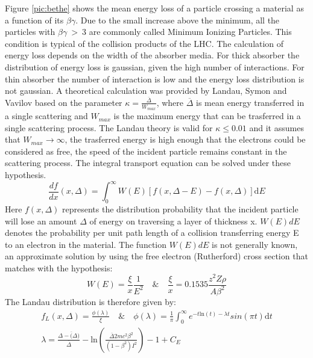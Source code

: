 Figure \ref{pic:bethe} shows the mean energy loss of a particle crossing a material as a function of its $\beta \gamma$.
Due to the small increase above the minimum, all the particles with $\beta \gamma~>~3$ are commonly called Minimum Ionizing Particles. This condition is typical of the collision products of the LHC.
The calculation of energy loss depends on the width of the absorber media. For thick absorber the distribution of energy loss is gaussian, given the high number of interactions. For thin absorber the number of interaction is low and the energy loss distribution is not gaussian. A theoretical calculation was provided by Landau\cite{landau}, Symon and Vavilov based on the parameter $\kappa = \frac{\overline{\Delta}}{W_{max}}$, where $\overline{\Delta}$ is mean energy transferred in a single scattering and $W_{max}$ is the maximum energy that can be trasferred in a single scattering process.
The Landau theory is valid for $\kappa \le 0.01$ and it assumes that $W_{max}\rightarrow \infty$, the trasferred energy is high enough that the electrons could be considered as free, the speed of the incident particle remains constant in the scattering process. The integral transport equation can be solved under these hypothesis.
\begin{equation}
\frac{df}{dx}(x,\Delta) = \int_0^{\infty}W(E)[f(x,\Delta - E)-f(x,\Delta)]\mathrm{d}E
\end{equation}
Here $f(x,\Delta)$ represents the distribution probability that the incident particle will lose an amount $\Delta$ of energy on traversing a layer of thickness x. $W(E)dE$ denotes the probability per unit path length of a collision transferring energy E to an electron in the material. The function $W(E)dE$ is not generally known, an approximate solution by using the free electron (Rutherford) cross section that matches with the hypothesis:
\begin{equation}
W(E) = \frac{\xi}{x} \frac{1}{E^2} \quad \& \quad \frac{\xi}{x}=0.1535\frac{z^2 Z \rho}{A \beta^2 } 
\end{equation}
The Landau distribution is therefore given by:
\begin{equation}
\begin{split}
f_L(x,\Delta) = \frac{\phi(\lambda)}{\xi}\quad \& \quad \phi(\lambda) = \frac{1}{\pi} \int_0^{\infty}e^{ -t \mathrm{ln}(t) -\lambda t  } sin(\pi t) \mathrm{d}t 
\\
\lambda = \frac{\Delta -\overline(\Delta)}{\overline{\Delta}} -\mathrm{ln}(\frac{\overline{\Delta} 2mc^2 \beta^2}{(1-\beta^2)I^2})- 1 +C_E
\end{split}
\end{equation}
